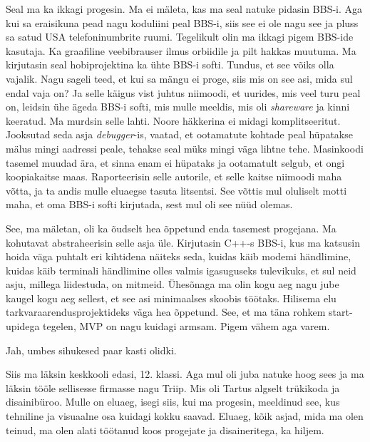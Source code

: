 
Seal ma ka ikkagi progesin. Ma ei mäleta, kas ma seal natuke pidasin BBS-i. Aga 
kui sa eraisikuna pead nagu koduliini peal BBS-i, siis see ei ole nagu see ja 
pluss sa satud  USA telefoninumbrite ruumi. Tegelikult olin ma ikkagi pigem 
BBS-ide kasutaja. Ka graafiline veebibrauser  ilmus orbiidile ja  pilt hakkas 
muutuma. Ma kirjutasin seal hobiprojektina ka ühte BBS-i softi. Tundus, et see 
võiks olla vajalik. Nagu sageli teed, et kui sa mängu ei proge, siis mis on 
see asi, mida sul endal vaja on? Ja selle käigus vist juhtus niimoodi, et  
uurides, mis veel turu peal on, leidsin ühe ägeda BBS-i softi, mis mulle 
meeldis, mis oli \emph{shareware} ja kinni keeratud. Ma murdsin selle lahti. 
Noore häkkerina ei midagi  komplitseeritut. Jooksutad seda asja 
\emph{debugger}-is, vaatad, et   ootamatute kohtade peal hüpatakse  mälus 
mingi aadressi peale, tehakse seal müks mingi väga lihtne tehe. Masinkoodi 
tasemel muudad ära, et sinna enam ei hüpataks ja ootamatult selgub, et ongi 
koopiakaitse maas. Raporteerisin selle autorile, et selle kaitse niimoodi maha 
võtta, ja ta andis mulle eluaegse tasuta litsentsi. See võttis mul oluliselt 
motti maha, et oma BBS-i softi kirjutada, sest mul oli see nüüd olemas. 

See, ma mäletan,  oli ka õudselt hea õppetund  enda tasemest progejana. 
Ma kohutavat abstraheerisin selle asja üle. Kirjutasin C++-s 
BBS-i, kus ma katsusin hoida väga puhtalt eri kihtidena näiteks seda,  kuidas 
käib modemi händlimine, kuidas käib terminali händlimine olles valmis 
igasuguseks tulevikuks, et sul neid asju, millega liidestuda, on mitmeid. 
Ühesõnaga ma olin kogu aeg nagu jube  kaugel kogu aeg sellest, et see asi  
minimaalses skoobis töötaks. Hilisema elu tarkvaraarendusprojektideks väga hea 
õppetund. See, et ma täna rohkem start-upidega tegelen,  MVP on nagu kuidagi 
armsam. Pigem vähem aga varem.


Jah,  umbes sihukesed paar kasti olidki. 


Siis ma läksin keskkooli edasi, 12. klassi. Aga  mul oli juba natuke hoog sees 
ja ma läksin tööle sellisesse firmasse nagu Triip. Mis oli Tartus 
algselt trükikoda ja disainibüroo. Mulle on eluaeg, isegi siis, kui ma 
progesin, meeldinud see, kus tehniline ja visuaalne osa kuidagi kokku saavad. 
Eluaeg, kõik asjad, mida ma olen teinud, ma olen alati töötanud koos progejate 
ja disaineritega, ka hiljem.

